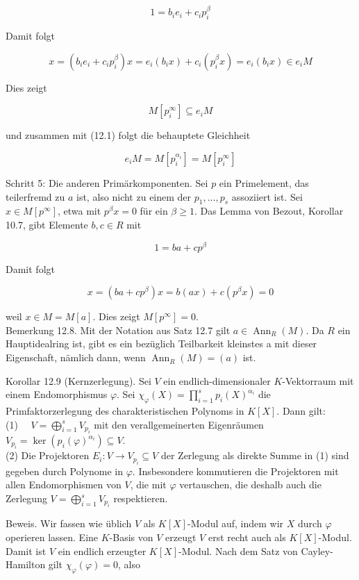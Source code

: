 \documentclass[10pt, letterpaper]{article}
\begin{document}
$$
1=b_{i} e_{i}+c_{i} p_{i}^{\beta}
$$

Damit folgt

$$
x=\left(b_{i} e_{i}+c_{i} p_{i}^{\beta}\right) x=e_{i}\left(b_{i} x\right)+c_{i}\left(p_{i}^{\beta} x\right)=e_{i}\left(b_{i} x\right) \in e_{i} M
$$

Dies zeigt

$$
M\left[p_{i}^{\infty}\right] \subseteq e_{i} M
$$

und zusammen mit (12.1) folgt die behauptete Gleichheit

$$
e_{i} M=M\left[p_{i}^{\alpha_{i}}\right]=M\left[p_{i}^{\infty}\right]
$$

Schritt 5: Die anderen Primärkomponenten. Sei $p$ ein Primelement, das teilerfremd zu $a$ ist, also nicht zu einem der $p_{1}, \ldots, p_{s}$ assoziiert ist. Sei $x \in M\left[p^{\infty}\right]$, etwa mit $p^{\beta} x=0$ für ein $\beta \geq 1$. Das Lemma von Bezout, Korollar 10.7, gibt Elemente $b, c \in R$ mit

$$
1=b a+c p^{\beta}
$$

Damit folgt

$$
x=\left(b a+c p^{\beta}\right) x=b(a x)+c\left(p^{\beta} x\right)=0
$$

weil $x \in M=M[a]$. Dies zeigt $M\left[p^{\infty}\right]=0$.\\
Bemerkung 12.8. Mit der Notation aus Satz 12.7 gilt $a \in \operatorname{Ann}_{R}(M)$. Da $R$ ein Hauptidealring ist, gibt es ein bezüglich Teilbarkeit kleinstes a mit dieser Eigenschaft, nämlich dann, wenn $\operatorname{Ann}_{R}(M)=(a)$ ist.

Korollar 12.9 (Kernzerlegung). Sei $V$ ein endlich-dimensionaler $K$-Vektorraum mit einem Endomorphismus $\varphi$. Sei $\chi_{\varphi}(X)=\prod_{i=1}^{s} p_{i}(X)^{\alpha_{i}}$ die Primfaktorzerlegung des charakteristischen Polynoms in $K[X]$. Dann gilt:\\
(1) $\quad V=\bigoplus_{i=1}^{s} V_{p_{i}}$ mit den verallgemeinerten Eigenräumen $V_{p_{i}}=\operatorname{ker}\left(p_{i}(\varphi)^{\alpha_{i}}\right) \subseteq V$.\\
(2) Die Projektoren $E_{i}: V \rightarrow V_{p_{i}} \subseteq V$ der Zerlegung als direkte Summe in (1) sind gegeben durch Polynome in $\varphi$. Insbesondere kommutieren die Projektoren mit allen Endomorphismen von $V$, die mit $\varphi$ vertauschen, die deshalb auch die Zerlegung $V=\bigoplus_{i=1}^{s} V_{p_{i}}$ respektieren.

Beweis. Wir fassen wie üblich $V$ als $K[X]$-Modul auf, indem wir $X$ durch $\varphi$ operieren lassen. Eine $K$-Basis von $V$ erzeugt $V$ erst recht auch als $K[X]$-Modul. Damit ist $V$ ein endlich erzeugter $K[X]$-Modul. Nach dem Satz von Cayley-Hamilton gilt $\chi_{\varphi}(\varphi)=0$, also
\end{document}
